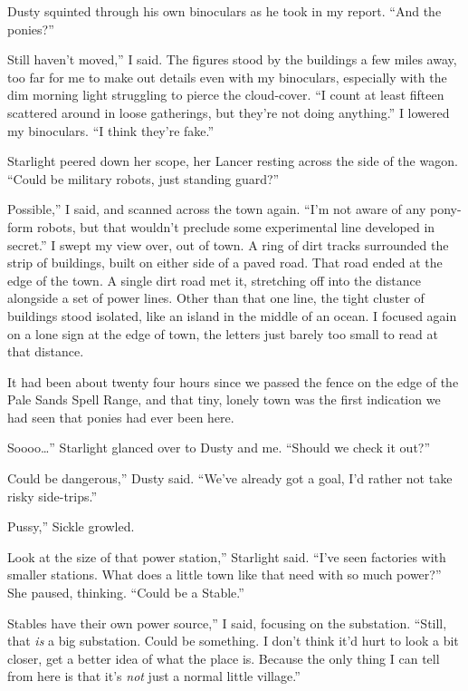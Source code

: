Dusty squinted through his own binoculars as he took in my report. “And the ponies?”

\leavevmode{}Still haven’t moved,” I said. The figures stood by the buildings a few miles away, too far for me to make out details even with my binoculars, especially with the dim morning light struggling to pierce the cloud-cover. “I count at least fifteen scattered around in loose gatherings, but they’re not doing anything.” I lowered my binoculars. “I think they’re fake.”

Starlight peered down her scope, her Lancer resting across the side of the wagon. “Could be military robots, just standing guard?”

\leavevmode{}Possible,” I said, and scanned across the town again. “I’m not aware of any pony-form robots, but that wouldn’t preclude some experimental line developed in secret.” I swept my view over, out of town. A ring of dirt tracks surrounded the strip of buildings, built on either side of a paved road. That road ended at the edge of the town. A single dirt road met it, stretching off into the distance alongside a set of power lines. Other than that one line, the tight cluster of buildings stood isolated, like an island in the middle of an ocean. I focused again on a lone sign at the edge of town, the letters just barely too small to read at that distance.

It had been about twenty four hours since we passed the fence on the edge of the Pale Sands Spell Range, and that tiny, lonely town was the first indication we had seen that ponies had ever been here.

\leavevmode{}Soooo…” Starlight glanced over to Dusty and me. “Should we check it out?”

\leavevmode{}Could be dangerous,” Dusty said. “We’ve already got a goal, I’d rather not take risky side-trips.”

\leavevmode{}Pussy,” Sickle growled.

\leavevmode{}Look at the size of that power station,” Starlight said. “I’ve seen factories with smaller stations. What does a little town like that need with so much power?” She paused, thinking. “Could be a Stable.”

\leavevmode{}Stables have their own power source,” I said, focusing on the substation. “Still, that \textit{is} a big substation. Could be something. I don’t think it’d hurt to look a bit closer, get a better idea of what the place is. Because the only thing I can tell from here is that it’s \textit{not} just a normal little village.”

